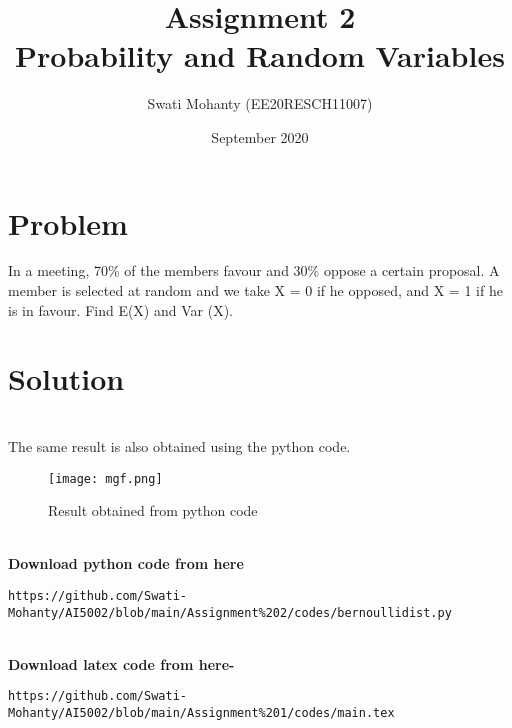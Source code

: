 \documentclass[journal,12pt,twocolumn]{IEEEtran}
\title{Assignment 2
\\Probability and Random Variables }
\author{Swati Mohanty (EE20RESCH11007) }
\date{September 2020}
\begin{document}
\maketitle


\section{Problem}
In a meeting, {70\%} of the members favour and {30\% }oppose a certain proposal. A member is selected at random and we take X = 0 if he opposed, and X = 1 if he is in favour. Find E(X) and Var (X).

\section{Solution}

\\The same result is also obtained using the python code.
\begin{figure}[h]
\renewcommand{\theenumi}{1}
\centering
\texttt{[image: mgf.png]}
\caption{Result obtained from python code }
\label{Fig:1}
\end{figure}
\\\textbf{Download python code from here}\\
\begin{lstlisting}
https://github.com/Swati-Mohanty/AI5002/blob/main/Assignment%202/codes/bernoullidist.py
\end{lstlisting}
\\\textbf{Download latex code from here-}\\
\begin{lstlisting}
https://github.com/Swati-Mohanty/AI5002/blob/main/Assignment%201/codes/main.tex
\end{lstlisting}
\end{document}
